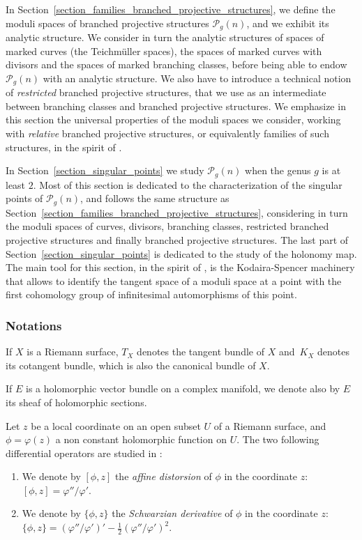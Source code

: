 \documentclass[JEP,XML,SOM,Unicode,NoEqCountersInSection,published]{cedram}
\theoremstyle{definition}
\theoremstyle{plain}
\begin{document}
In Section~\ref{section_families_branched_projective_structures}, we define the moduli spaces of branched projective structures $\mathcal P_g(n)$, and we exhibit its analytic structure.
We consider in turn the analytic structures of spaces of marked curves (the Teichmüller spaces), the spaces of marked curves with divisors and the spaces of marked branching classes, before being able to endow $\mathcal P_g(n)$ with an analytic structure.
We also have to introduce a technical notion of \emph{restricted} branched projective structures, that we use as an intermediate between branching classes and branched projective structures.
We emphasize in this section the universal properties of the moduli spaces we consider, working with \emph{relative} branched projective structures, or equivalently families of such structures, in the spirit of \cite{hubbard}.

In Section~\ref{section_singular_points} we study $\mathcal P_g(n)$ when the genus $g$ is at least $2$.
Most of this section is dedicated to the characterization of the singular points of $\mathcal P_g(n)$, and follows the same structure as Section~\ref{section_families_branched_projective_structures}, considering in turn the moduli spaces of curves, divisors, branching classes, restricted branched projective structures and finally branched projective structures.
The last part of Section~\ref{section_singular_points} is dedicated to the study of the holonomy map.
The main tool for this section, in the spirit of \cite{hubbard}, is the Kodaira-Spencer machinery that allows to identify the tangent space of a moduli space at a point with the first cohomology group of infinitesimal automorphisms of this point.

\subsubsection*{Notations}

If $X$ is a Riemann surface, $T_X$ denotes the tangent bundle of $X$ and~$K_X$ denotes its cotangent bundle, which is also the canonical bundle of $X$.

If $E$ is a holomorphic vector bundle on a complex manifold, we denote also by $E$ its sheaf of holomorphic sections.

Let $z$ be a local coordinate on an open subset $U$ of a Riemann surface, and $\phi = \varphi(z)$ a non constant holomorphic function on $U$. The two following differential operators are studied in \cite{gunning}:
\begin{enumerate}
\item
We denote by $[\phi, z]$ the \emph{affine distorsion} of $\phi$ in the coordinate $z$: $[\phi, z] = \varphi''/\varphi'$.
\item
We denote by $\{\phi, z\}$ the \emph{Schwarzian derivative} of $\phi$ in the coordinate $z$: $\{\phi, z\} = \left(\varphi''/\varphi'\right)' - \frac 12 \left(\varphi''/\varphi'\right)^2$.
\end{enumerate}
\end{document}
